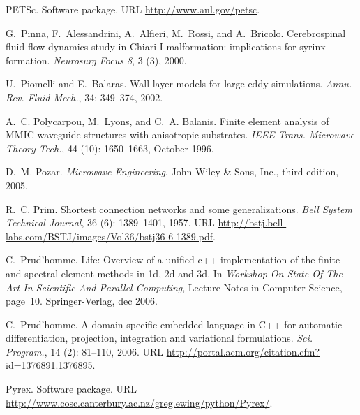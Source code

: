 \begin{thebibliography}{467}
PETSc.
\newblock Software package.
\newblock URL \url{http://www.anl.gov/petsc}.

G.~Pinna, F.~Alessandrini, A.~Alfieri, M.~Rossi, and A.~Bricolo.
\newblock Cerebrospinal fluid flow dynamics study in {C}hiari {I} malformation:
  implications for syrinx formation.
\newblock \emph{Neurosurg Focus 8}, 3 (3), 2000.

U.~Piomelli and E.~Balaras.
\newblock Wall-layer models for large-eddy simulations.
\newblock \emph{Annu. Rev. Fluid Mech.}, 34: 349--374, 2002.

A.~C. Polycarpou, M.~Lyons, and C.~A. Balanis.
\newblock Finite element analysis of {MMIC} waveguide structures with
  anisotropic substrates.
\newblock \emph{IEEE Trans. Microwave Theory Tech.}, 44 (10):
  1650--1663, October 1996.

D.~M. Pozar.
\newblock \emph{Microwave Engineering}.
\newblock John Wiley \& Sons, Inc., third edition, 2005.

R.~C. Prim.
\newblock Shortest connection networks and some generalizations.
\newblock \emph{Bell System Technical Journal}, 36 (6):
  1389--1401, 1957.
\newblock URL
  \url{http://bstj.bell-labs.com/BSTJ/images/Vol36/bstj36-6-1389.pdf}.

C.~Prud'homme.
\newblock Life: Overview of a unified c++ implementation of the finite and
  spectral element methods in 1d, 2d and 3d.
\newblock In \emph{Workshop On State-Of-The-Art In Scientific And Parallel
  Computing}, Lecture Notes in Computer Science, page~10. Springer-Verlag, dec
  2006{}.

C.~Prud'homme.
\newblock A domain specific embedded language in {C++} for automatic
  differentiation, projection, integration and variational formulations.
\newblock \emph{Sci. Program.}, 14 (2): 81--110,
  2006{}.
\newblock URL \url{http://portal.acm.org/citation.cfm?id=1376891.1376895}.

Pyrex.
\newblock Software package.
\newblock URL \url{http://www.cosc.canterbury.ac.nz/greg.ewing/python/Pyrex/}.


\end{thebibliography}
